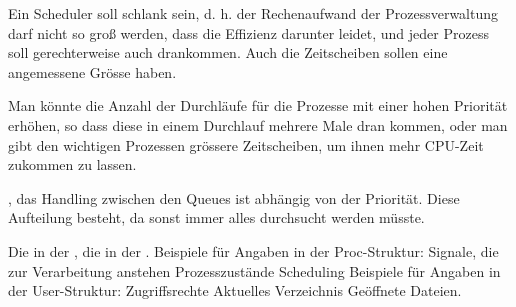 \begin{answer}
  Ein Scheduler soll schlank  sein, d. h. der Rechenaufwand der Prozessverwaltung
  darf nicht so groß werden, dass die Effizienz darunter leidet, und jeder Prozess soll
  gerechterweise auch drankommen. Auch die Zeitscheiben sollen eine angemessene Grösse
  haben.
\end{answer}

\begin{answer}
  Man könnte die Anzahl der Durchläufe für die Prozesse mit einer hohen Priorität erhöhen,
  so dass diese in einem Durchlauf mehrere Male dran kommen, oder man gibt den wichtigen
  Prozessen grössere Zeitscheiben, um ihnen mehr CPU-Zeit zukommen zu lassen.
\end{answer}

\begin{answer}
  , das Handling zwischen den Queues ist abhängig von der Priorität. Diese
  Aufteilung besteht, da sonst immer alles durchsucht werden müsste.
\end{answer}

\begin{answer}
  Die in der ,
  die in der .
  Beispiele für Angaben in der Proc-Struktur:
  Signale, die zur Verarbeitung anstehen
  Prozesszustände
  Scheduling
  Beispiele für Angaben in der User-Struktur:
  Zugriffsrechte
  Aktuelles Verzeichnis
  Geöffnete Dateien.
\end{answer}


